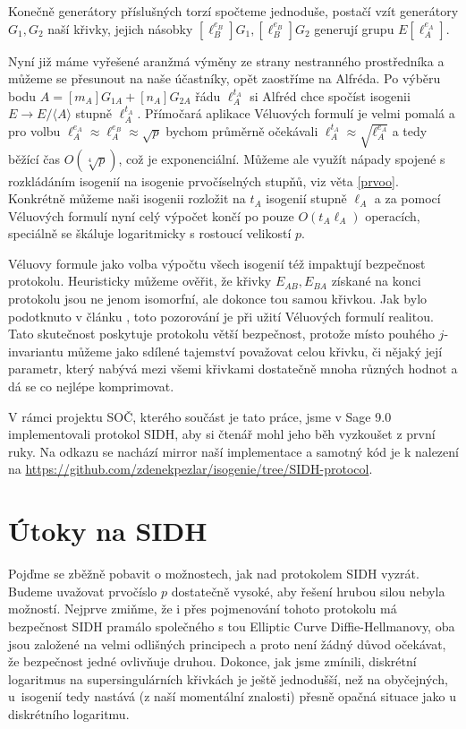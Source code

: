 \documentclass[12pt]{report}
\begin{document}
Konečně generátory příslušných torzí spočteme jednoduše, postačí vzít generátory $G_1,G_2$ naší křivky, jejich násobky $[\ell_B ^{e_B}] G_1, [\ell_B ^{e_B}] G_2$ generují grupu $E[\ell_A ^{e_A}]$.

Nyní již máme vyřešené aranžmá výměny ze strany nestranného prostředníka a můžeme se přesunout na naše účastníky, opět zaostříme na Alfréda. Po výběru bodu $A = [m_A] G_{1A} + [n_A] G_{2A}$ řádu $\ell_A ^{t_A}$ si Alfréd chce spočíst isogenii $E \longrightarrow E/\langle A \rangle$ stupně $\ell_A ^{t_A}$. Přímočará aplikace Véluových formulí je velmi pomalá a pro volbu $\ell_A ^{e_A} \approx \ell_A ^{e_B} \approx \sqrt{p}$ bychom průměrně očekávali $\ell_A ^{t_A} \approx \sqrt{\ell_A ^{e_A}}$ a tedy běžící čas $O(\sqrt[4]{p})$, což je exponenciální. Můžeme ale využít nápady spojené s rozkládáním isogenií na isogenie prvočíselných stupňů, viz věta \ref{prvoo}. Konkrétně můžeme naši isogenii rozložit na $t_A$ isogenií stupně $\ell_A$ a za pomocí Véluových formulí nyní celý výpočet končí po pouze $O(t_A \ell_A)$ operacích, speciálně se škáluje logaritmicky s rostoucí velikostí $p$.

Véluovy formule jako volba výpočtu všech isogenií též impaktují bezpečnost protokolu. Heuristicky můžeme ověřit, že křivky $E_{AB},E_{BA}$ získané na konci protokolu jsou ne jenom isomorfní, ale dokonce tou samou křivkou. Jak bylo podotknuto v článku \cite{Leonardi}, toto pozorování je při užití Véluových formulí realitou. Tato skutečnost poskytuje protokolu větší bezpečnost, protože místo pouhého $j$-invariantu můžeme jako sdílené tajemství považovat celou křivku, či nějaký její parametr, který nabývá mezi všemi křivkami dostatečně mnoha různých hodnot a dá se co nejlépe komprimovat. 

V rámci projektu SOČ, kterého součást je tato práce, jsme v Sage 9.0 implementovali protokol SIDH, aby si čtenář mohl jeho běh vyzkoušet z první ruky. Na odkazu se nachází mirror naší implementace a samotný kód je k nalezení na \url{https://github.com/zdenekpezlar/isogenie/tree/SIDH-protocol}.

\section{Útoky na SIDH}

Pojďme se zběžně pobavit o možnostech, jak nad protokolem SIDH vyzrát. Budeme uvažovat prvočíslo $p$ dostatečně vysoké, aby řešení hrubou silou nebyla možností. Nejprve zmiňme, že i přes pojmenování tohoto protokolu má bezpečnost SIDH pramálo společného s tou Elliptic Curve Diffie-Hellmanovy, oba jsou založené na velmi odlišných principech a proto není žádný důvod očekávat, že bezpečnost jedné ovlivňuje druhou. Dokonce, jak jsme zmínili, diskrétní logaritmus na supersingulárních křivkách je ještě jednodušší, než na obyčejných, u~isogenií tedy nastává (z naší momentální znalosti) přesně opačná situace jako u diskrétního logaritmu.
\end{document}
